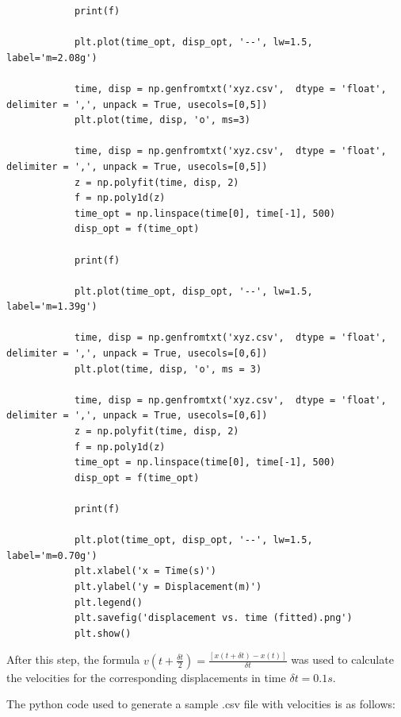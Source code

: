 \documentclass{article}
\begin{document}
\begin{lstlisting}
			print(f)
			
			plt.plot(time_opt, disp_opt, '--', lw=1.5, label='m=2.08g')
			
			time, disp = np.genfromtxt('xyz.csv',  dtype = 'float', delimiter = ',', unpack = True, usecols=[0,5])
			plt.plot(time, disp, 'o', ms=3)
			
			time, disp = np.genfromtxt('xyz.csv',  dtype = 'float', delimiter = ',', unpack = True, usecols=[0,5])
			z = np.polyfit(time, disp, 2)
			f = np.poly1d(z)
			time_opt = np.linspace(time[0], time[-1], 500)
			disp_opt = f(time_opt)
			
			print(f)
			
			plt.plot(time_opt, disp_opt, '--', lw=1.5, label='m=1.39g')
			
			time, disp = np.genfromtxt('xyz.csv',  dtype = 'float', delimiter = ',', unpack = True, usecols=[0,6])
			plt.plot(time, disp, 'o', ms = 3)
			
			time, disp = np.genfromtxt('xyz.csv',  dtype = 'float', delimiter = ',', unpack = True, usecols=[0,6])
			z = np.polyfit(time, disp, 2)
			f = np.poly1d(z)
			time_opt = np.linspace(time[0], time[-1], 500)
			disp_opt = f(time_opt)
			
			print(f)
			
			plt.plot(time_opt, disp_opt, '--', lw=1.5, label='m=0.70g')
			plt.xlabel('x = Time(s)')
			plt.ylabel('y = Displacement(m)')
			plt.legend()
			plt.savefig('displacement vs. time (fitted).png')
			plt.show()
		\end{lstlisting}
	 
	 After this step, the formula $v(t+\frac{\delta t}{2}) = \frac{[x(t+\delta t) - x(t)]}{\delta t}$ was used to calculate the velocities for the corresponding displacements in time $\delta t = 0.1s$.
	 
	 \pagebreak
	 
	 The python code used to generate a sample .csv file with velocities is as follows:
	 
\end{document}
